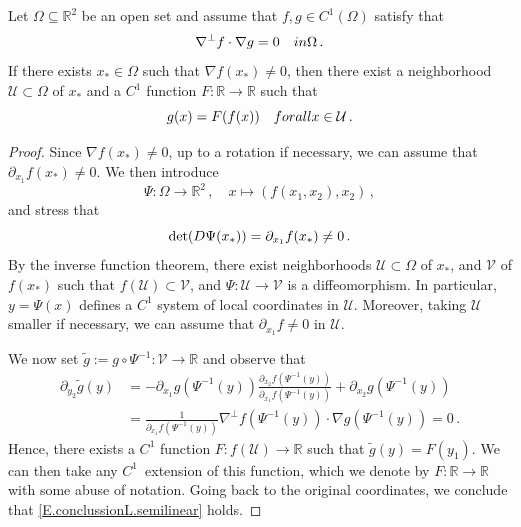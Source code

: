 \documentclass[10pt,a4paper]{amsart}
\def\RR{\mathbb{R}}
\newcommand{\Om}{\Omega}
\newcommand{\pd}{\partial}
\begin{document}
\begin{lemma} \label{L.semilinear}
    Let $\Om \subseteq \RR^2$ be an open set and assume that $f,g \in C^1(\Omega)$ satisfy that
    $$
    \nabla^{\perp} f \cdot \nabla g = 0 \quad \textup{in } \Omega\,.
    $$
    If there exists $x_* \in \Omega$ such that $\nabla f (x_*) \neq 0$, then there exist a neighborhood $\mathcal U \subset \Omega$ of $x_*$ and a $C^1$ function $F: \RR \to \RR$ such that
    \begin{equation} \label{E.conclussionL.semilinear}
    g(x) = F(f(x)) \quad \textup{for all } x \in \mathcal{U}\,.
    \end{equation}
\end{lemma}

\begin{proof}
    Since $\nabla f(x_*) \neq 0$, up to a rotation if necessary, we can assume that $\pd_{x_1} f(x_*) \neq 0$. We then introduce $$
    \Psi: \Om \to \RR^2\,, \quad x \mapsto(f(x_1,x_2),x_2)\,,
    $$
    and stress that
    $$
    \det ({\rm D} \Psi(x_*)) = \pd_{x_1} f(x_*) \neq 0\,.
    $$
    By the inverse function theorem, there exist neighborhoods $\mathcal{U} \subset \Omega$ of $x_*$, and $\mathcal{V}$ of $f(x_*)$ such that $f(\mathcal{U}) \subset \mathcal{V}$, and $\Psi: \mathcal{U} \to \mathcal{V}$ is a diffeomorphism. In particular, $y = \Psi(x)$ defines a $C^1$ system of local coordinates in $\mathcal{U}$. Moreover, taking $\mathcal{U}$ smaller if necessary, we can assume that $\pd_{x_1} f \neq 0$ in $\mathcal{U}$.

    We now set $\widetilde{g} := g \circ \Psi^{-1}: \mathcal{V} \to \RR$ and observe that
    \begin{align*}
        \pd_{y_2} \widetilde{g}(y) & = - \pd_{x_1} g (\Psi^{-1}(y)) \frac{\pd_{x_2}f(\Psi^{-1}(y))}{\pd_{x_1}f(\Psi^{-1}(y))} + \pd_{x_2} g(\Psi^{-1}(y)) \\
        & = \frac{1}{\pd_{x_1}f(\Psi^{-1}(y))} \nabla^{\perp}f(\Psi^{-1}(y)) \cdot \nabla g (\Psi^{-1}(y))= 0\,.
    \end{align*}
    Hence, there exists a $C^1$ function $F: f(\mathcal{U}) \to \RR$ such that $\widetilde{g}(y) = F(y_1)$. We can then take any $C^1$~extension of this function, which we denote by $F:\RR\to\RR$ with some abuse of notation. Going back to the original coordinates, we conclude that \eqref{E.conclussionL.semilinear} holds.
\end{proof}
\end{document}
